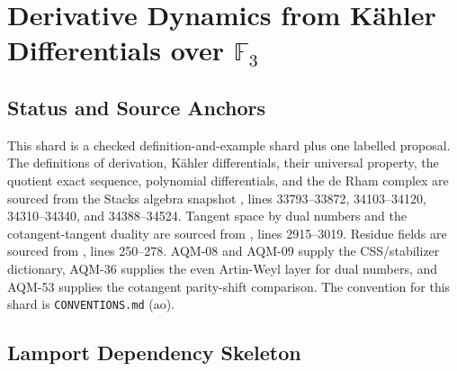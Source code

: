 
\section{Derivative Dynamics from Kähler Differentials over \texorpdfstring{\(\mathbb F_3\)}{F3}}
\label{sec:derivative-dynamics-f3-examples}

\subsection{Status and Source Anchors}

This shard is a checked definition-and-example shard plus one labelled
proposal.  The definitions of derivation, Kähler differentials, their
universal property, the quotient exact sequence, polynomial differentials, and
the de Rham complex are sourced from the Stacks algebra snapshot
, lines
33793--33872, 34103--34120, 34310--34340, and 34388--34524.  Tangent space by
dual numbers and the cotangent-tangent duality are sourced from
, lines
2915--3019.  Residue fields are sourced from
, lines
250--278.  AQM-08 and AQM-09 supply the CSS/stabilizer dictionary, AQM-36
supplies the even Artin-Weyl layer for dual numbers, and AQM-53 supplies the
cotangent parity-shift comparison.  The convention for this shard is
\texttt{CONVENTIONS.md} (ao).

\subsection{Lamport Dependency Skeleton}

